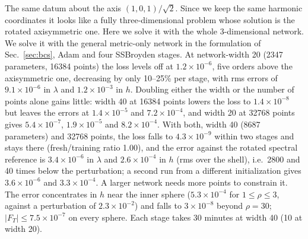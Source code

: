 \documentclass[aps,prd,twocolumn,superscriptaddress, nofootinbib,floatfix]{revtex4-2}
\begin{document}
The same datum about the axis $(1,0,1)/\sqrt2$. Since we keep the same harmonic coordinates it looks like a fully three-dimensional problem whose solution is the rotated axisymmetric one. Here we solve it with the whole 3-dimensional network. We solve it with the general metric-only network in the formulation of Sec.~\ref{sec:bcs}, Adam and four SSBroyden stages.
At network-width 20 (2347 parameters, 16384 points) the loss levels off at $1.2\times10^{-6}$, five orders above the axisymmetric one, decreasing by only 10--25\% per stage, with rms errors of $9.1\times10^{-6}$ in $\lambda$ and $1.2\times10^{-3}$ in $h$.
Doubling either the width or the number of points alone gains little: width 40 at 16384 points lowers the loss to $1.4\times10^{-8}$ but leaves the errors at $1.4\times10^{-5}$ and $7.2\times10^{-4}$, and width 20 at 32768 points gives $5.4\times10^{-7}$, $1.9\times10^{-5}$ and $8.2\times10^{-4}$.
With both, width 40 (8687 parameters) and 32768 points, the loss falls to $4.3\times10^{-9}$ within two stages and stays there (fresh/training ratio 1.00), and the error against the rotated spectral reference is $3.4\times10^{-6}$ in $\lambda$ and $2.6\times10^{-4}$ in $h$ (rms over the shell), i.e.\ 2800 and 40 times below the perturbation; a second run from a different initialization gives $3.6\times10^{-6}$ and $3.3\times10^{-4}$.
A larger network needs more points to constrain it.
The error concentrates in $h$ near the inner sphere ($5.3\times10^{-4}$ for $1\le\rho\le3$, against a perturbation of $2.3\times10^{-2}$) and falls to $3\times10^{-8}$ beyond $\rho=30$; $|F_T|\le7.5\times10^{-7}$ on every sphere.
Each stage takes 30 minutes at width 40 (10 at width 20).
\end{document}
